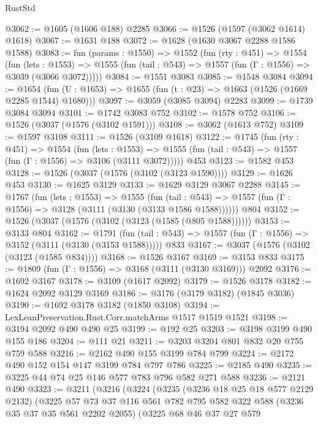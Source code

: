 \begin{lexlean}{RustStd}
\begin{coremodule}
@3062 := @1605 (@1606 @188) @2285
@3066 := @1526 (@1597 (@3062 @1614) @1618)
@3067 := @1631 @188
@3072 := @1628 (@1630 @3067 @2288 @1586 @1588)
@3083 := fun (params : @1550) =>
  @1552
    (fun (rty : @451) =>
    @1554
      (fun (lets : @1553) =>
      @1555 (fun (tail : @543) => @1557 (fun (Γ : @1556) => @3039 (@3066 @3072)))))
@3084 := @1551 @3083
@3085 := @1548 @3084
@3094 := @1654 (fun (U : @1653) => @1655 (fun (t : @23) => @1663 (@1526 (@1669 @2285 @1544) @1680)))
@3097 := @3059 (@3085 @3094) @2283
@3099 := @1739 @3084 @3094
@3101 := @1742 @3083 @752
@3102 := @1578 @752
@3106 := @1526 (@3037 (@1576 (@3102 @1591)))
@3108 := @3062 (@1613 @752)
@3109 := @1597 @3108
@3111 := @1526 (@3109 @1618)
@3122 := @1745
    (fun (rty : @451) =>
    @1554
      (fun (lets : @1553) =>
      @1555 (fun (tail : @543) => @1557 (fun (Γ : @1556) => @3106 (@3111 @3072)))))
    @453
@3123 := @1582 @453
@3128 := @1526 (@3037 (@1576 (@3102 (@3123 @1590))))
@3129 := @1626 @453
@3130 := @1625 @3129
@3133 := @1629 @3129 @3067 @2288
@3145 := @1767
    (fun (lets : @1553) =>
    @1555
      (fun (tail : @543) => @1557 (fun (Γ : @1556) => @3128 (@3111 (@3130 (@3133 @1586 @1588))))))
    @804
@3152 := @1526 (@3037 (@1576 (@3102 (@3123 (@1585 (@805 @1588))))))
@3153 := @3133 @804
@3162 := @1791
    (fun (tail : @543) => @1557 (fun (Γ : @1556) => @3152 (@3111 (@3130 (@3153 @1588)))))
    @833
@3167 := @3037 (@1576 (@3102 (@3123 (@1585 @834))))
@3168 := @1526 @3167
@3169 := @3153 @833
@3175 := @1809 (fun (Γ : @1556) => @3168 (@3111 (@3130 @3169))) @2092
@3176 := @1692 @3167
@3178 := @3109 (@1617 @2092)
@3179 := @1526 @3178
@3182 := @1624 @2092 @3129 @3169
@3186 := @3176 (@3179 @3182) (@1845 @3036)
@3190 := @1692 @3178 @3182 (@1850 @3108)
@3194 := LexLeanPreservation.Rust.Corr.matchArms @1517 @1519 @1521
@3198 := @3194 @2092 @490 @490 @25
@3199 := @192 @25
@3203 := @3198 @3199 @490 @155 @186
@3204 := @111 @21
@3211 := @3203 @3204 @801 @832 @20 @755 @759 @588
@3216 := @2162 @490 @155 @3199 @784 @799
@3224 := @2172 @490 @152 @154 @147 @3199 @784 @797 @786
@3225 := @2185 @490
@3235 := @3225 @44 @74 @25 @146 @577 @783 @796 @582 @271 @588
@3236 := @2121 @490
@3323 := @3211
    (@3216
      (@3224
        (@3235
          (@3236 @18 @25 @18 @577 @2129 @2132)
          (@3225
            @57
            @73
            @37
            @116
            @561
            @782
            @795
            @582
            @322
            @588
            (@3236 @35 @37 @35 @561 @2202 @2055)
            (@3225
              @68
              @46
              @37
              @27
              @579

\end{coremodule}
\end{lexlean}
